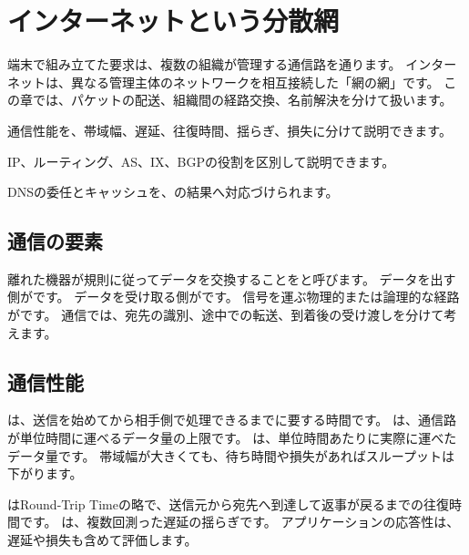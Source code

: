 \chapter{インターネットという分散網}
\label{chap:internet}

\begin{chapterabstract}
端末で組み立てた要求は、複数の組織が管理する通信路を通ります。
インターネットは、異なる管理主体のネットワークを相互接続した「網の網」です。
この章では、パケットの配送、組織間の経路交換、名前解決を分けて扱います。
\end{chapterabstract}

\begin{learninggoals}
  \item 通信性能を、帯域幅、遅延、往復時間、揺らぎ、損失に分けて説明できます。
  \item IP、ルーティング、AS、IX、BGPの役割を区別して説明できます。
  \item DNSの委任とキャッシュを、の結果へ対応づけられます。
\end{learninggoals}


\section{通信の要素}

離れた機器が規則に従ってデータを交換することをと呼びます。
データを出す側がです。
データを受け取る側がです。
信号を運ぶ物理的または論理的な経路がです。
通信では、宛先の識別、途中での転送、到着後の受け渡しを分けて考えます。

\section{通信性能}

は、送信を始めてから相手側で処理できるまでに要する時間です。
は、通信路が単位時間に運べるデータ量の上限です。
は、単位時間あたりに実際に運べたデータ量です。
帯域幅が大きくても、待ち時間や損失があればスループットは下がります。

はRound-Trip Timeの略で、送信元から宛先へ到達して返事が戻るまでの往復時間です。
は、複数回測った遅延の揺らぎです。
アプリケーションの応答性は、遅延や損失も含めて評価します。

